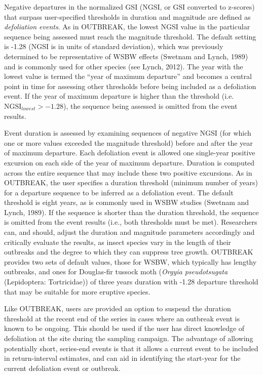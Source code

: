\documentclass[review]{elsarticle} %
\begin{document}
Negative departures in the normalized GSI (NGSI, or GSI converted to z-scores) that surpass user-specified thresholds in duration and magnitude are defined as \emph{defoliation events}. As in OUTBREAK, the lowest NGSI value in the particular sequence being assessed must reach the magnitude threshold. The default setting is -1.28 (NGSI is in units of standard deviation), which was previously determined to be representative of WSBW effects (Swetnam and Lynch, 1989) and is commonly used for other species (see Lynch, 2012). The year with the lowest value is termed the ``year of maximum departure'' and becomes a central point in time for assessing other thresholds before being included as a defoliation event. If the year of maximum departure is higher than the threshold (i.e.~\(\textrm{NGSI}_{lowest} > -1.28\)), the sequence being assessed is omitted from the event results.

Event duration is assessed by examining sequences of negative NGSI (for which one or more values exceeded the magnitude threshold) before and after the year of maximum departure. Each defoliation event is allowed one single-year positive excursion on each side of the year of maximum departure. Duration is computed across the entire sequence that may include these two positive excursions. As in OUTBREAK, the user specifies a duration threshold (minimum number of years) for a departure sequence to be inferred as a defoliation event. The default threshold is eight years, as is commonly used in WSBW studies (Swetnam and Lynch, 1989). If the sequence is shorter than the duration threshold, the sequence is omitted from the event results (i.e., both thresholds must be met). Researchers can, and should, adjust the duration and magnitude parameters accordingly and critically evaluate the results, as insect species vary in the length of their outbreaks and the degree to which they can suppress tree growth. OUTBREAK provides two sets of default values, those for WSBW, which typically has lengthy outbreaks, and ones for Douglas-fir tussock moth (\emph{Orgyia pseudotsugata} (Lepidoptera: Tortricidae)) of three years duration with -1.28 departure threshold that may be suitable for more eruptive species.

Like OUTBREAK, users are provided an option to suspend the duration threshold at the recent end of the series in cases where an outbreak event is known to be ongoing. This should be used if the user has direct knowledge of defoliation at the site during the sampling campaign. The advantage of allowing potentially short, series-end events is that it allows a current event to be included in return-interval estimates, and can aid in identifying the start-year for the current defoliation event or outbreak.
\end{document}
